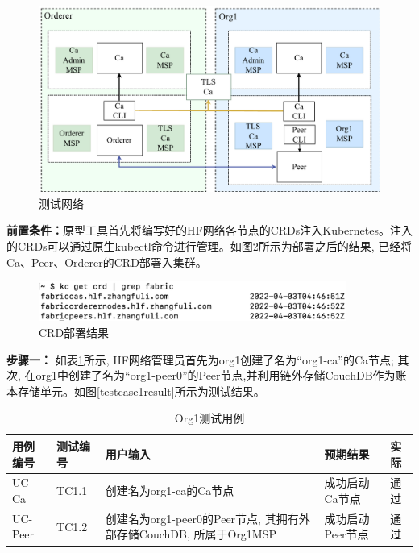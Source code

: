 \begin{figure}[h] %
    \centering %
    \includegraphics[width=1.0\textwidth]{FIGs/chapter5/fabric_net.pdf} %
    \caption{测试网络} %
    \label{fabric_net} %
\end{figure}%

\textbf{前置条件：}原型工具首先将编写好的HF网络各节点的CRDs注入Kubernetes。注入的CRDs可以通过原生kubectl命令进行管理。如图\ref{crdresult}所示为部署之后的结果, 已经将Ca、Peer、Orderer的CRD部署入集群。

\begin{figure}[h] %
    \centering %
    \includegraphics[width=0.9\textwidth]{FIGs/chapter5/crds.png} %
    \caption{CRD部署结果} %
    \label{crdresult} %
\end{figure}%

\textbf{步骤一：} 如表\ref{org1_test}所示, HF网络管理员首先为org1创建了名为“org1-ca”的Ca节点; 其次, 在org1中创建了名为“org1-peer0”的Peer节点,并利用链外存储CouchDB作为账本存储单元。如图\ref{testcase1result}所示为测试结果。

{\footnotesize
\begin{longtable}[h]{m{45pt} m{45pt} m{180pt} m{50pt} m{20pt}}
    \caption[创建Org1测试用例]{Org1测试用例} \label{org1_test}\\
        \hline  
        用例编号&测试编号&用户输入&预期结果&实际\\
        \hline
        UC-Ca & TC1.1 & 创建名为org1-ca的Ca节点 & 成功启动Ca节点 & 通过 \\
        \hline
        UC-Peer & TC1.2 & 创建名为org1-peer0的Peer节点, 其拥有外部存储CouchDB, 所属于Org1MSP & 成功启动Peer节点 & 通过 \\
        \hline
    \end{longtable} 
}

